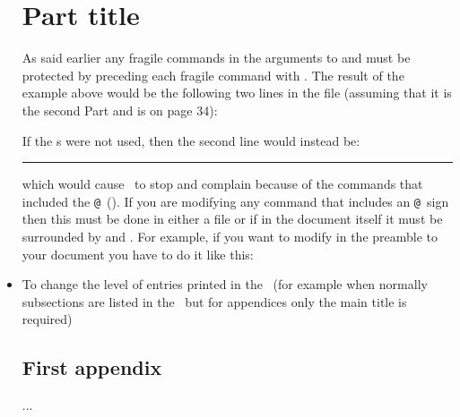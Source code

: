 \begin{itemize}
\begin{lcode}
 \part{Part title}
 \end{lcode}
 As  said earlier any fragile commands in the arguments to 
\cmd{\addtocontents} and \cmd{\addcontentsline} must be protected
 by preceding each fragile command with \cmd{\protect}. 
 The result of the example above
 would be the following two lines in the  file (assuming that it
 is the second Part and is on page 34):
 \begin{lcode}
 \mbox {}\hrulefill \par
 \end{lcode}
 If the \cmd{\protect}s were not used, then the second line would 
instead be:
 \begin{lcode}
 \unhbox \voidb@x \hbox {}\unhbox \voidb@x \leaders \hrule \hfill 
         \kern \z@ \par
 \end{lcode}
which would cause \ltx\ to stop and complain because of the commands
that included the \texttt{@}\idxatincode\ (\seeatincode).
If you are modifying any command that includes an 
\texttt{@}\idxatincode\
sign then this must be done in either a  file or if in the 
document itself it must be surrounded by \cmd{\makeatletter} and 
\cmd{\makeatother}. For example, if you
 want to modify \cmd{\@dotsep} in the preamble to your 
document you have to do it like this:
 \begin{lcode}
 \makeatletter
 \renewcommand{\@dotsep}{9.0}
 \makeatother
 \end{lcode}

\item To change the level of entries printed in the \toc\ (for example
      when normally subsections are listed in the \toc\ but for
      appendices only the main title is required)
  \begin{lcode}
  \appendix
  \chapter{First appendix}
  ...
  \end{lcode}

 \end{itemize}
 
